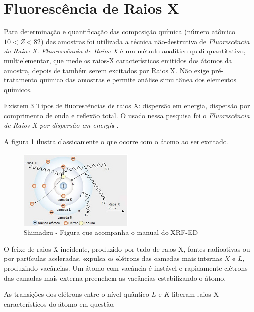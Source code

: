 \section{Fluorescência de Raios X}

Para determinação e quantificação das composição química (número atômico $ 10 < Z < 82$)
das amostras foi utilizada a técnica não-destrutiva de \textit{Fluorescência de Raios X}.
\textit{Fluorescência de Raios X} é um método analítico quali-quantitativo, 
multielementar, que mede os raios-X característicos emitidos dos átomos da amostra, 
depois de também serem excitados por Raios X. Não exige pré-tratamento químico
das amostras e permite análise simultânea dos elementos químicos.

Existem 3 Tipos de fluorescências de raios X: dispersão em energia,
dispersão por comprimento de onda e reflexão total.
O usado nessa pesquisa foi o 
\textit{Fluorescência de Raios X por dispersão em energia} \cite{jenkins1988}.

A figura \ref{fig:shimadzu_atomo} ilustra classicamente o que ocorre com
o átomo ao ser excitado.

\begin{figure}[H]
\begin{center} 
  \includegraphics[width=0.5\textwidth]{../inputs/images/shimadzu_atomo.jpg}
  \caption{Shimadzu - Figura que acompanha o manual do XRF-ED \label{fig:shimadzu_atomo}}
\end{center}
\end{figure}

O feixe de raios X incidente, produzido por tudo de raios X, fontes radioativas
ou por partículas aceleradas, expulsa os elétrons das camadas mais 
internas $K$ e $L$, produzindo vacâncias. 
Um átomo com vacância é instável e rapidamente elétrons das camadas 
mais externa preenchem as vacâncias estabilizando o átomo.

As transições dos elétrons entre o nível quântico $L$ e
$K$ liberam raios X característicos do átomo em questão. 

